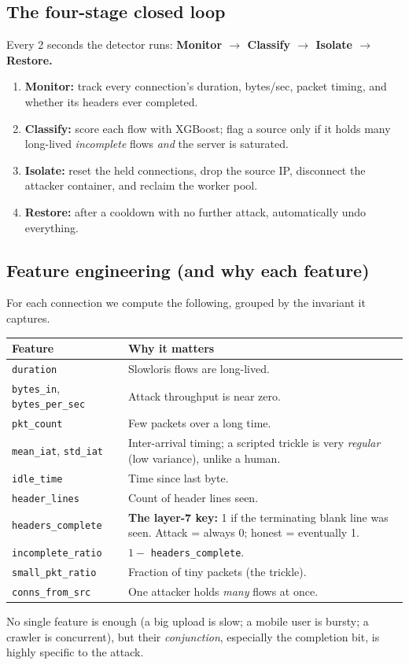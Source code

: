 \documentclass[11pt,a4paper]{article}
\begin{document}
\subsection{The four-stage closed loop}
Every 2 seconds the detector runs: \textbf{Monitor $\rightarrow$ Classify
$\rightarrow$ Isolate $\rightarrow$ Restore.}
\begin{enumerate}
  \item \textbf{Monitor:} track every connection's duration, bytes/sec, packet
  timing, and whether its headers ever completed.
  \item \textbf{Classify:} score each flow with XGBoost; flag a source only if it
  holds many long-lived \emph{incomplete} flows \emph{and} the server is saturated.
  \item \textbf{Isolate:} reset the held connections, drop the source IP,
  disconnect the attacker container, and reclaim the worker pool.
  \item \textbf{Restore:} after a cooldown with no further attack, automatically
  undo everything.
\end{enumerate}

\subsection{Feature engineering (and why each feature)}
For each connection we compute the following, grouped by the invariant it captures.
\begin{longtable}{>{\raggedright}p{} p{}}
\toprule
\textbf{Feature} & \textbf{Why it matters} \\
\midrule
\endhead
\texttt{duration} & Slowloris flows are long-lived. \\
\texttt{bytes\_in}, \texttt{bytes\_per\_sec} & Attack throughput is near zero. \\
\texttt{pkt\_count} & Few packets over a long time. \\
\texttt{mean\_iat}, \texttt{std\_iat} & Inter-arrival timing; a scripted trickle is
very \emph{regular} (low variance), unlike a human. \\
\texttt{idle\_time} & Time since last byte. \\
\texttt{header\_lines} & Count of header lines seen. \\
\texttt{headers\_complete} & \textbf{The layer-7 key:} 1 if the terminating blank
line was seen. Attack = always 0; honest = eventually 1. \\
\texttt{incomplete\_ratio} & $1 -$ \texttt{headers\_complete}. \\
\texttt{small\_pkt\_ratio} & Fraction of tiny packets (the trickle). \\
\texttt{conns\_from\_src} & One attacker holds \emph{many} flows at once. \\
\bottomrule
\end{longtable}
No single feature is enough (a big upload is slow; a mobile user is bursty; a
crawler is concurrent), but their \emph{conjunction}, especially the completion
bit, is highly specific to the attack.
\end{document}
